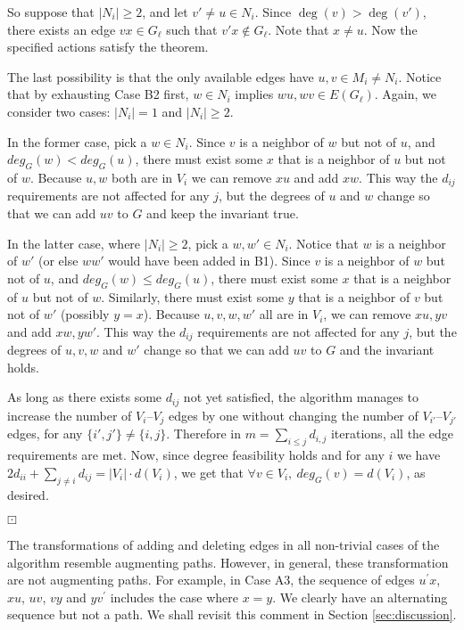 \documentclass[12pt,a4paper]{article}
\theoremstyle{definition}
\theoremstyle{plain}
\newenvironment{prf}{\noindent {\bf Proof.}}{\begin{flushright}\vspace{-2em}\footnotesize$\boxdot$\normalsize\end{flushright}\smallskip}
\begin{document}
\begin{prf}
So suppose that $|N_i|\geq 2$, and let $v' \ne u \in N_i$. 
Since $\deg(v) > \deg(v')$, there exists an edge $vx \in G_{\ell}$ such that 
$v'x \not \in G_{\ell}$.  Note that $x \ne u$. 
Now the specified actions satisfy the theorem.


The last possibility is that the only available 
edges have $u,v \in M_i \ne N_i$.
Notice that by exhausting Case B2 first, 
$w\in N_i$ implies $wu, wv \in E(G_{\ell})$.
Again, we consider two cases: $|N_i|=1$ and $|N_i|\geq 2$.

In the former case, pick a $w\in N_i$. Since $v$ is a 
neighbor of $w$ but not of $u$, 
and $deg_G(w) < deg_G(u)$, there must exist some $x$ that is a 
neighbor of $u$ but not of $w$. 
Because $u,w$ both are in $V_i$  
we can remove $xu$ and add $xw$. 
This way the $d_{ij}$ requirements are not affected for any $j$, 
but the degrees of $u$ and $w$ change so that we can add $uv$ to $G$ and keep
the invariant true.

In the latter case, where $|N_i|\geq 2$, 
pick a $w, w'\in N_i$. Notice that $w$
is a neighbor of $w'$ 
(or else $ww'$ would have been added in B1). 
Since $v$ is a neighbor of $w$ but not of $u$,
and $deg_G(w)\leq deg_G(u)$, 
there must exist some $x$ that is a neighbor of $u$ but not of $w$. 
Similarly, there must exist some $y$ that is a neighbor of $v$ 
but not of $w'$ (possibly $y=x$). 
Because $u,v,w,w'$ all are in $V_i$, we can remove $xu, yv$ 
and add $xw, yw'$. This way the $d_{ij}$ requirements 
are not affected for any $j$, but the degrees of $u,v, w$ and $w'$ change 
so that we can add $uv$ to $G$ and the invariant holds.

As long as there exists some $d_{ij}$ not yet satisfied, 
the algorithm manages to increase the number of $V_i$--$V_j$ edges
by one without changing the number of $V_{i'}$--$V_{j'}$ edges, 
for any $\{i',j'\}\neq\{i,j\}$. Therefore in $m=\sum_{i\leq j} d_{i,j}$
iterations, all the edge requirements are met. 
Now, since degree feasibility holds and for any $i$ 
we have $2d_{ii}+\sum_{j\neq i} d_{ij} = |V_i| \cdot {d}(V_i)$, 
we get that $\forall v\in V_i, \ deg_{G}(v)={d}(V_i)$, as desired.
\end{prf}


 The transformations of  
adding and deleting edges in all non-trivial cases of the algorithm
resemble augmenting paths.
However, in general, these transformation are not
augmenting paths. For example, in Case A3,
the sequence of edges
$u^{\prime}x$, $xu$, $uv$,
$vy$ and $yv^{\prime}$
includes the case where $x \! = \! y$.
We clearly have an alternating sequence but not a path.
We shall revisit this comment in Section \ref{sec:discussion}.\medskip
\end{document}
